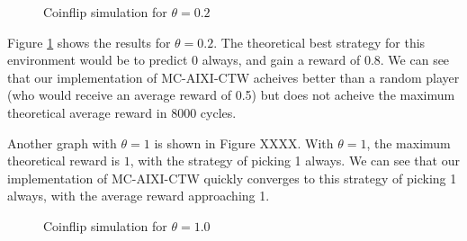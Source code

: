 \documentclass[pdftex,twoside,a4paper]{report}
\newcommand{\mac}{MC-AIXI-CTW}
\begin{document}
\begin{figure}
\centering
\caption{Coinflip simulation for $\theta=0.2$}
\label{fig:coin_0_2}
\end{figure}
	
Figure \ref{fig:coin_0_2} shows the results for $\theta=0.2$. The theoretical best strategy for this environment would be to predict $0$ always, and gain a reward of $0.8$. We can see that our implementation of \mac{} acheives better than a random player (who would receive an average reward of 0.5) but does not acheive the maximum theoretical average reward in 8000 cycles.
 
Another graph with $\theta = 1$ is shown in Figure XXXX. With $\theta = 1$, the maximum theoretical reward is $1$, with the strategy of picking 1 always. We can see that our implementation of \mac{} quickly converges to this strategy of picking 1 always, with the average reward approaching 1.
\begin{figure}
\centering
\caption{Coinflip simulation for $\theta=1.0$}
\label{fig:coin_1_0}
\end{figure}
\end{document}
